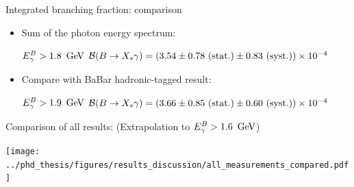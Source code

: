 \documentclass[xcolor=dvipsnames]{beamer}
\begin{document}
\begin{frame}{Integrated branching fraction: comparison}
\centering\scriptsize

\begin{itemize}
   \item Sum of the photon energy spectrum:
\end{itemize}
\begin{itemize}
   \centering
   \item[${E^B_{\gamma}}>1.8~\mathrm{\,Ge\kern -0.1em V}$] $\mathcal{B}(\BtoXsgamma) = (3.54 \pm 0.78~(\text{stat.}) \pm 0.83~(\text{syst.}))\times 10^{-4}$ \\
\end{itemize}

\begin{itemize}
   \item Compare with BaBar hadronic-tagged result:
\end{itemize}
\begin{itemize}
   \centering
   \item[${E^B_{\gamma}}>1.9~\mathrm{\,Ge\kern -0.1em V}$]  $\mathcal{B}(\BtoXsgamma) = (3.66 \pm 0.85~(\text{stat.}) \pm 0.60~(\text{syst.}))\times 10^{-4}$ \\
\end{itemize}

\vspace{10pt}

Comparison of all results: (Extrapolation to ${E^B_{\gamma}}>1.6~\mathrm{\,Ge\kern -0.1em V}$)

      \texttt{[image: ../phd\_thesis/figures/results\_discussion/all\_measurements\_compared.pdf]}


      
\end{frame}

    
\end{document}
